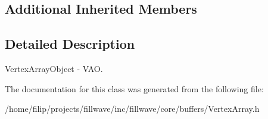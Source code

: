 \subsection*{Additional Inherited Members}


\subsection{Detailed Description}
Vertex\+Array\+Object -\/ V\+AO. 

The documentation for this class was generated from the following file\+:\begin{DoxyCompactItemize}
\item 
/home/filip/projects/fillwave/inc/fillwave/core/buffers/Vertex\+Array.\+h\end{DoxyCompactItemize}
